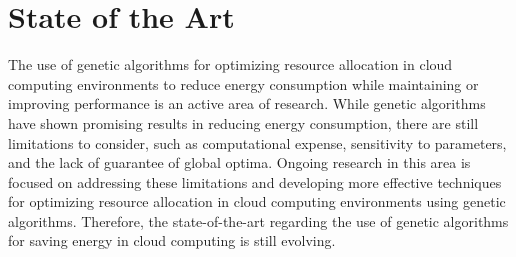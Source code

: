 \section{State of the Art}\label{sect:sota}

The use of genetic algorithms for optimizing resource allocation in cloud computing environments 
to reduce energy consumption while maintaining or improving performance is an active area of research. 
While genetic algorithms have shown promising results in reducing energy consumption, there are still limitations to consider, 
such as computational expense, sensitivity to parameters, and the lack of guarantee of global optima. 
Ongoing research in this area is focused on addressing these limitations and developing more effective techniques 
for optimizing resource allocation in cloud computing environments using genetic algorithms. 
Therefore, the state-of-the-art regarding the use of genetic algorithms for saving energy in cloud computing is still evolving.